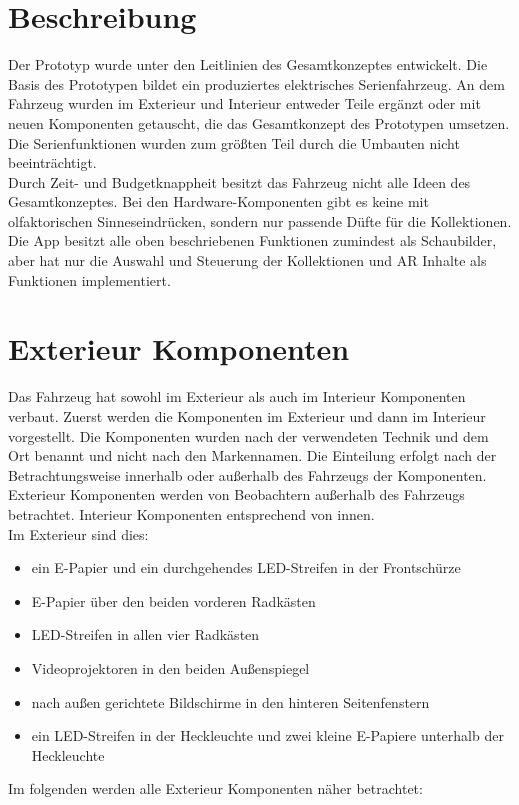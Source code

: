 \section{Beschreibung}
Der Prototyp wurde unter den Leitlinien des Gesamtkonzeptes entwickelt. Die Basis des Prototypen bildet ein produziertes elektrisches Serienfahrzeug. An dem Fahrzeug wurden im Exterieur und Interieur entweder Teile ergänzt oder mit neuen Komponenten getauscht, die das Gesamtkonzept des Prototypen umsetzen. Die Serienfunktionen wurden zum größten Teil durch die Umbauten nicht beeinträchtigt.\\
Durch Zeit- und Budgetknappheit besitzt das Fahrzeug nicht alle Ideen des Gesamtkonzeptes. Bei den Hardware-Komponenten gibt es keine mit olfaktorischen Sinneseindrücken, sondern nur passende Düfte für die Kollektionen. Die App besitzt alle oben beschriebenen Funktionen zumindest als Schaubilder, aber hat nur die Auswahl und Steuerung der Kollektionen und AR Inhalte als Funktionen implementiert.
\section{Exterieur Komponenten}
Das Fahrzeug hat sowohl im Exterieur als auch im Interieur Komponenten verbaut. Zuerst werden die Komponenten im Exterieur und dann im Interieur vorgestellt. Die Komponenten wurden nach der verwendeten Technik und dem Ort benannt und nicht nach den Markennamen. Die Einteilung erfolgt nach der Betrachtungsweise innerhalb oder außerhalb des Fahrzeugs der Komponenten. Exterieur Komponenten werden von Beobachtern außerhalb des Fahrzeugs betrachtet. Interieur Komponenten entsprechend von innen.\\
Im Exterieur sind dies:
\begin{itemize}
	\item ein E-Papier und ein durchgehendes LED-Streifen in der Frontschürze
	\item E-Papier über den beiden vorderen Radkästen
	\item LED-Streifen in allen vier Radkästen
	\item Videoprojektoren in den beiden Außenspiegel
	\item nach außen gerichtete Bildschirme in den hinteren Seitenfenstern
	\item ein LED-Streifen in der Heckleuchte und zwei kleine E-Papiere unterhalb der Heckleuchte
\end{itemize}
Im folgenden werden alle Exterieur Komponenten näher betrachtet:
